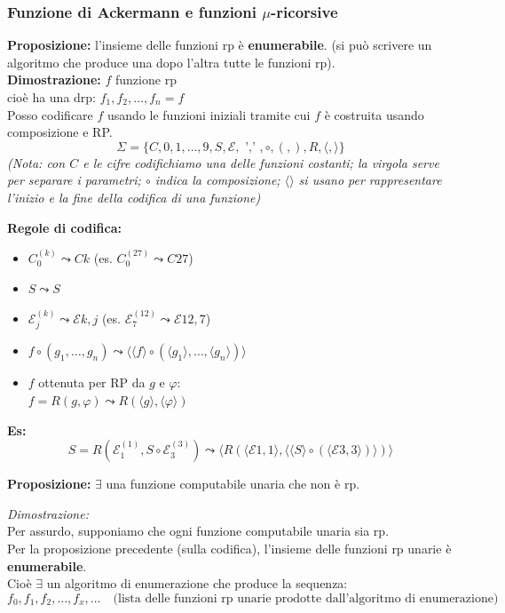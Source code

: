 \subsubsection{Funzione di Ackermann e funzioni $\mu$-ricorsive}

\textbf{Proposizione:} l'insieme delle funzioni rp è \textbf{enumerabile}. (si può scrivere un algoritmo che produce una dopo l'altra tutte le funzioni rp).\\
\textbf{Dimostrazione:} $f$ funzione rp \\
cioè ha una drp: $f_1, f_2, \dots, f_n = f$ \\
Posso codificare $f$ usando le funzioni iniziali tramite cui $f$ è costruita usando composizione e RP.
$$ \Sigma = \{ C, 0, 1, \dots, 9, S, \mathcal{E},  \text{ ',' } , \circ, (, ), R, \langle, \rangle \} $$
\textit{(Nota: con $C$ e le cifre codifichiamo una delle funzioni costanti; la virgola serve per separare i parametri; $\circ$ indica la composizione; $\langle \rangle$ si usano per rappresentare l'inizio e la fine della codifica di una funzione)}

\textbf{Regole di codifica:}
\begin{itemize}
    \item $C_0^{(k)} \leadsto Ck$ \quad (es. $C_0^{(27)} \leadsto C27$)
    \item $S \leadsto S$
    \item $\mathcal{E}_j^{(k)} \leadsto \mathcal{E}k,j$ \quad (es. $\mathcal{E}_7^{(12)} \leadsto \mathcal{E}12,7$)
    \item $f \circ (g_1, \dots, g_n) \leadsto \langle \langle f \rangle \circ (\langle g_1 \rangle, \dots, \langle g_n \rangle) \rangle$
    \item $f$ ottenuta per RP da $g$ e $\varphi$: \\
    $f = R(g, \varphi) \leadsto R(\langle g \rangle, \langle \varphi \rangle)$
\end{itemize}

\textbf{Es:}
$$ S = R(\mathcal{E}_1^{(1)}, S \circ \mathcal{E}_3^{(3)}) \leadsto \langle R( \langle \mathcal{E}1,1 \rangle, \langle \langle S \rangle \circ (\langle \mathcal{E}3,3 \rangle) \rangle ) \rangle $$

\vspace{0.4cm}
\textbf{Proposizione:} $\exists$ una funzione computabile unaria che non è rp.

\textit{Dimostrazione:} \\
Per assurdo, supponiamo che ogni funzione computabile unaria sia rp. \\
Per la proposizione precedente (sulla codifica), l'insieme delle funzioni rp unarie è \textbf{enumerabile}. \\
Cioè $\exists$ un algoritmo di enumerazione che produce la sequenza:
$$ f_0, f_1, f_2, \dots, f_x, \dots \quad \text{(lista delle funzioni rp unarie prodotte dall'algoritmo di enumerazione)} $$

